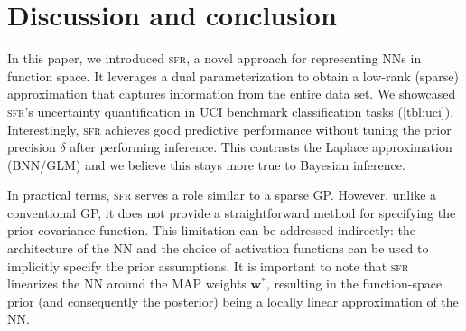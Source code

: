 \documentclass{article}
\newcommand{\our}{\textsc{sfr}\xspace}
\newcommand{\weights}{\ensuremath{\mathbf{w}}}
\begin{document}
\section{Discussion and conclusion}
\label{sec:conclusion}
%
In this paper, we introduced \our, a novel approach for representing NNs in function space.
It leverages a dual parameterization to obtain a low-rank (sparse) approximation that captures information from the entire data set.
We showcased \our's uncertainty quantification in UCI benchmark classification tasks (\cref{tbl:uci}).
Interestingly, \our achieves good predictive performance without tuning the prior precision $\delta$ after performing inference.
This contrasts the Laplace approximation (BNN/GLM) and we believe this stays more true to Bayesian inference.%


In practical terms, \our serves a role similar to a sparse GP. However, unlike a conventional GP, it does not provide a straightforward method for specifying the prior covariance function.
This limitation can be addressed indirectly: the architecture of the NN and the choice of activation functions can be used to implicitly specify the prior assumptions.
It is important to note that \our linearizes the NN around the MAP weights $\weights^{*}$, resulting in the function-space prior
(and consequently the posterior) being a locally linear approximation of the NN.
\end{document}
